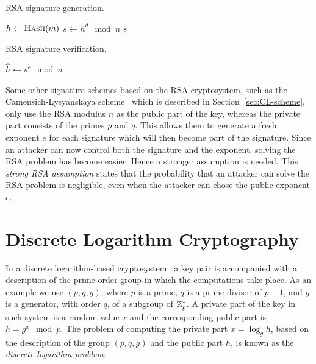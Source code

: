 \begin{algorithm}[H]
  \caption{RSA signature generation.}
  \label{alg:RSA-sign}
  \addtolength{\baselineskip}{1mm}
  \begin{algorithmic}[1]
      \State $h \gets \Call{Hash}{m}$
      \State $s \gets h^d \mod n$
      \Return $s$
    \EndFunction
  \end{algorithmic}
\end{algorithm}
\begin{algorithm}[H]
  \caption{RSA signature verification.}
  \label{alg:RSA-verify}
  \addtolength{\baselineskip}{1mm}
  \begin{algorithmic}[1]
      \State $\hat{h} \gets s^e \mod n$
        \Return {}
      \EndIf
      \Return {}
    \EndFunction
  \end{algorithmic}
\end{algorithm}

Some other signature schemes based on the RSA cryptosystem, such as the
Camensich-Lysyanskaya scheme~\cite{CamenischLysyanskaya2003}
 which is described
in Section~\ref{sec:CL-scheme}, only use the RSA modulus $n$ as the public part
of the key, whereas the private part consists of the primes $p$ and $q$. This
allows them to generate a fresh exponent $e$ for each signature which will then
become part of the signature. Since an attacker can now control both the
signature and the exponent, solving the RSA problem has become easier. Hence a
stronger assumption is needed. This \emph{strong RSA assumption} states that the
probability that an attacker can solve the RSA problem is negligible, even when
the attacker can chose the public exponent $e$.

\section{Discrete Logarithm Cryptography}

In a discrete logarithm-based cryptosystem~\cite{DH1976,ElGamal1985} a key pair
is accompanied with a description of the prime-order group in which the
computations take place. As an example we use $(p, q, g)$, where $p$ is a prime,
$q$ is a prime divisor of $p-1$, and $g$ is a generator, with order $q$, of a
subgroup of $\mathbb{Z}^*_p$. A private part of the key in such system is a random value
$x$ and the corresponding public part is $h = g^x \mod p$. The problem of
computing the private part $x = \log_g h$, based on the description of the group
$(p, q, g)$ and the public part $h$, is known as the \emph{discrete logarithm
problem}.

